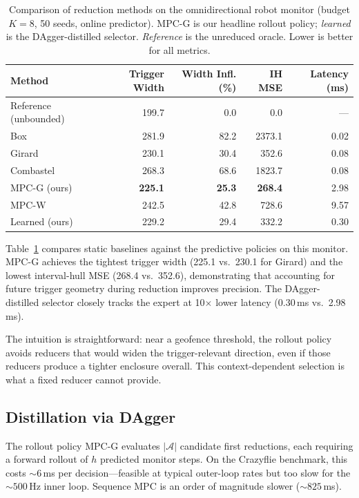 \documentclass{article}
\begin{document}
\begin{table}[t]
\centering
\caption{Comparison of reduction methods on the omnidirectional robot monitor (budget $K=8$, 50 seeds, online predictor). MPC-G is our headline rollout policy; \emph{learned} is the DAgger-distilled selector. \emph{Reference} is the unreduced oracle. Lower is better for all metrics.}
\label{tab:toy}
\small
\begin{tabular}{@{}lrrrr@{}}
\toprule
Method & Trigger Width & Width Infl. (\%) & IH MSE & Latency (ms) \\
\midrule
Reference (unbounded) & 199.7 & 0.0 & 0.0 & --- \\
\midrule
Box           & 281.9 & 82.2 & 2373.1 & 0.02 \\
Girard        & 230.1 & 30.4 & 352.6  & 0.08 \\
Combastel     & 268.3 & 68.6 & 1823.7 & 0.08 \\
\midrule
MPC-G (ours)  & \textbf{225.1} & \textbf{25.3} & \textbf{268.4}  & 2.98 \\
MPC-W         & 242.5 & 42.8 & 728.6  & 9.57 \\
Learned (ours)& 229.2 & 29.4 & 332.2  & 0.30 \\
\bottomrule
\end{tabular}
\end{table}

Table~\ref{tab:toy} compares static baselines against the predictive policies on this monitor.
MPC-G achieves the tightest trigger width (225.1 vs.\ 230.1 for Girard) and the lowest interval-hull MSE (268.4 vs.\ 352.6), demonstrating that accounting for future trigger geometry during reduction improves precision.
The DAgger-distilled selector closely tracks the expert at 10$\times$ lower latency (0.30\,ms vs.\ 2.98\,ms).

The intuition is straightforward: near a geofence threshold, the rollout policy avoids reducers that would widen the trigger-relevant direction, even if those reducers produce a tighter enclosure overall.
This context-dependent selection is what a fixed reducer cannot provide.


\subsection{Distillation via DAgger}\label{sec:distillation}

The rollout policy MPC-G evaluates $|\mathcal{A}|$ candidate first reductions, each requiring a forward rollout of $h$ predicted monitor steps.
On the Crazyflie benchmark, this costs ${\sim}6$\,ms per decision---feasible at typical outer-loop rates but too slow for the ${\sim}500$\,Hz inner loop.
Sequence MPC is an order of magnitude slower (${\sim}825$\,ms).
\end{document}
